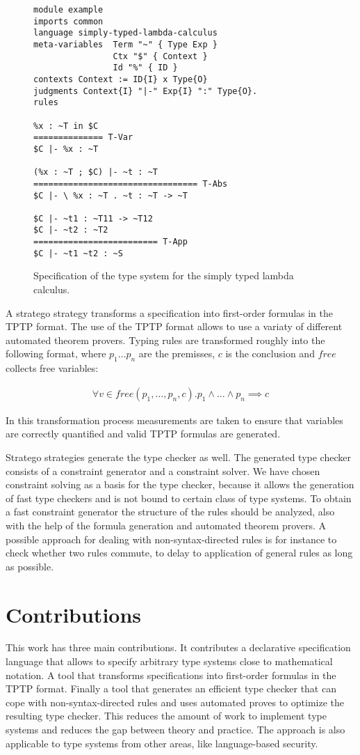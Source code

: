 \documentclass[preprint]{sigplanconf}
\begin{document}
\begin{figure}
\begin{verbatim}
module example
imports common
language simply-typed-lambda-calculus
meta-variables 	Term "~" { Type Exp }
                Ctx "$" { Context }
                Id "%" { ID }
contexts Context := ID{I} x Type{O}
judgments Context{I} "|-" Exp{I} ":" Type{O}.
rules

%x : ~T in $C
============== T-Var
$C |- %x : ~T

(%x : ~T ; $C) |- ~t : ~T
================================= T-Abs
$C |- \ %x : ~T . ~t : ~T -> ~T

$C |- ~t1 : ~T11 -> ~T12
$C |- ~t2 : ~T2
========================= T-App
$C |- ~t1 ~t2 : ~S
\end{verbatim}
\caption{Specification of the type system for the simply typed lambda
  calculus.}
\label{fig:example-specification}
\end{figure}

A stratego strategy transforms a specification into first-order
formulas in the TPTP \cite{Sutcliffe04tstpdata-exchange} format. The
use of the TPTP format allows to use a variaty of different automated
theorem provers. Typing rules are transformed roughly into the
following format, where $p_1 \dots p_n$ are the premisses, $c$ is the
conclusion and $free$ collects free variables:

\begin{align}
  \forall v \in free(p_1, \dots, p_n, c) . p_1 \land \dots \land p_n \implies  c 
\end{align}

In this transformation process measurements are taken to ensure that
variables are correctly quantified and valid TPTP formulas are
generated.

Stratego strategies generate the type checker as well. The generated
type checker consists of a constraint generator and a constraint
solver. We have chosen constraint solving as a basis for the type
checker, because it allows the generation of fast type checkers and is
not bound to certain class of type systems. To obtain a fast
constraint generator the structure of the rules should be analyzed,
also with the help of the formula generation and automated theorem
provers. A possible approach for dealing with non-syntax-directed
rules is for instance to check whether two rules commute, to delay to
application of general rules as long as possible.
\section{Contributions}
This work has three main contributions. It contributes a declarative
specification language that allows to specify arbitrary type systems
close to mathematical notation. A tool that transforms specifications
into first-order formulas in the TPTP format. Finally a tool that
generates an efficient type checker that can cope with
non-syntax-directed rules and uses automated proves to optimize the
resulting type checker. This reduces the amount of work to implement
type systems and reduces the gap between theory and practice. The
approach is also applicable to type systems from other areas, like
language-based security.
\end{document}
